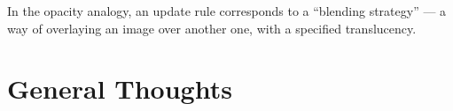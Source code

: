 \documentclass{article}
\begin{document}









In the opacity analogy, an update rule corresponds to a ``blending strategy'' --- a way of overlaying an image over another one, with a specified translucency.


\newpage
\printbibliography


\appendix
\section{General Thoughts}
\end{document}

